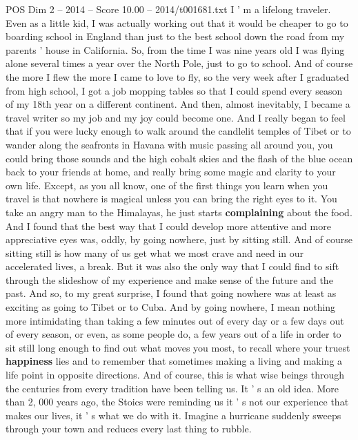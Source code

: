 \begin{textsample}{POS Dim 2 – 2014 – Score 10.00 – 2014/t001681.txt}  \label{ex:f2_pos_063}
I ' m a lifelong traveler.
Even as a little kid, I was actually working out that it would be cheaper to go to boarding school in England than just to the best school down the road from my parents ' house in California.
So, from the time I was nine years old I was flying alone several times a year over the North Pole, just to go to school.
And of course the more I flew the more I came to love to fly, so the very week after I graduated from high school, I got a job mopping tables so that I could spend every season of my 18th year on a different continent.
And then, almost inevitably, I became a travel writer so my job and my joy could become one.
And I really began to feel that if you were lucky enough to walk around the candlelit temples of Tibet or to wander along the seafronts in Havana with music passing all around you, you could bring those sounds and the high cobalt skies and the flash of the blue ocean back to your friends at home, and really bring some magic and clarity to your own life.
Except, as you all know, one of the first things you learn when you travel is that nowhere is magical unless you can bring the right eyes to it.
You take an angry man to the Himalayas, he just starts \textbf{complaining} about the food.
And I found that the best way that I could develop more attentive and more appreciative eyes was, oddly, by going nowhere, just by sitting still.
And of course sitting still is how many of us get what we most crave and need in our accelerated lives, a break.
But it was also the only way that I could find to sift through the slideshow of my experience and make sense of the future and the past.
And so, to my great surprise, I found that going nowhere was at least as exciting as going to Tibet or to Cuba.
And by going nowhere, I mean nothing more intimidating than taking a few minutes out of every day or a few days out of every season, or even, as some people do, a few years out of a life in order to sit still long enough to find out what moves you most, to recall where your truest \textbf{happiness} lies and to remember that sometimes making a living and making a life point in opposite directions.
And of course, this is what wise beings through the centuries from every tradition have been telling us.
It ' s an old idea.
More than 2, 000 years ago, the Stoics were reminding us it ' s not our experience that makes our lives, it ' s what we do with it.
Imagine a hurricane suddenly sweeps through your town and reduces every last thing to rubble.

\end{textsample}
